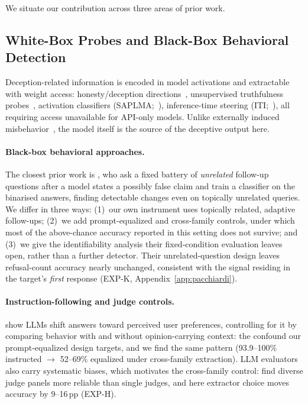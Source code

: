 

We situate our contribution across three areas of prior work.

\subsection{White-Box Probes and Black-Box Behavioral Detection}

Deception-related information is encoded in model activations and extractable with weight access: honesty/deception directions~\citep{zou2023representation}, unsupervised truthfulness probes~\citep{burns2022discovering}, activation classifiers (SAPLMA;~\citealp{azaria2023internal}), inference-time steering (ITI;~\citealp{li2023inference}), all requiring access unavailable for API-only models. Unlike externally induced misbehavior~\citep{goodfellow2014explaining, perez2022ignore}, the model itself is the source of the deceptive output here.

\paragraph{Black-box behavioral approaches.} The closest prior work is \citet{pacchiardi2024catch}, who ask a fixed battery of \emph{unrelated} follow-up questions after a model states a possibly false claim and train a classifier on the binarised answers, finding detectable changes even on topically unrelated queries. We differ in three ways: (1)~our own instrument uses topically related, adaptive follow-ups; (2)~we add prompt-equalized and cross-family controls, under which most of the above-chance accuracy reported in this setting does not survive; and (3)~we give the identifiability analysis their fixed-condition evaluation leaves open, rather than a further detector. Their unrelated-question design leaves refusal-count accuracy nearly unchanged, consistent with the signal residing in the target's \emph{first} response (EXP-K, Appendix~\ref{app:pacchiardi}).

\paragraph{Instruction-following and judge controls.} \citet{sharma2023sycophancy} show LLMs shift answers toward perceived user preferences, controlling for it by comparing behavior with and without opinion-carrying context: the confound our prompt-equalized design targets, and we find the same pattern (93.9--100\% instructed $\to$ 52--69\% equalized under cross-family extraction). LLM evaluators also carry systematic biases, which motivates the cross-family control: \citet{verga2024replacing} find diverse judge panels more reliable than single judges, and here extractor choice moves accuracy by 9--16\,pp (EXP-H).

